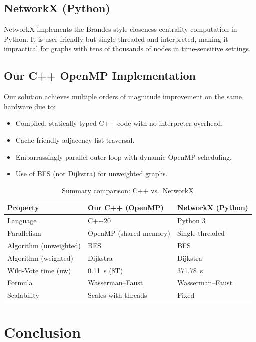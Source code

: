 \documentclass[12pt,a4paper]{article}
\begin{document}
\subsection{NetworkX (Python)}
NetworkX implements the Brandes-style closeness centrality computation in Python.
It is user-friendly but single-threaded and interpreted, making it impractical for graphs
with tens of thousands of nodes in time-sensitive settings.

\subsection{Our C++ OpenMP Implementation}
Our solution achieves multiple orders of magnitude improvement on the same hardware due to:
\begin{itemize}
  \item Compiled, statically-typed C++ code with no interpreter overhead.
  \item Cache-friendly adjacency-list traversal.
  \item Embarrassingly parallel outer loop with dynamic OpenMP scheduling.
  \item Use of BFS (not Dijkstra) for unweighted graphs.
\end{itemize}

\begin{table}[H]
\centering
\caption{Summary comparison: C++ vs.\ NetworkX}
\begin{tabular}{p{4cm}p{4.5cm}p{4.5cm}}
\toprule
\textbf{Property} & \textbf{Our C++ (OpenMP)} & \textbf{NetworkX (Python)} \\
\midrule
Language       & C++20            & Python 3 \\
Parallelism    & OpenMP (shared memory) & Single-threaded \\
Algorithm (unweighted) & BFS     & BFS \\
Algorithm (weighted)   & Dijkstra & Dijkstra \\
Wiki-Vote time (uw) & 0.11~s (8T) & 371.78~s \\
Formula        & Wasserman--Faust & Wasserman--Faust \\
Scalability    & Scales with threads & Fixed \\
\bottomrule
\end{tabular}
\end{table}

\section{Conclusion}
\label{sec:conclusion}
\end{document}
